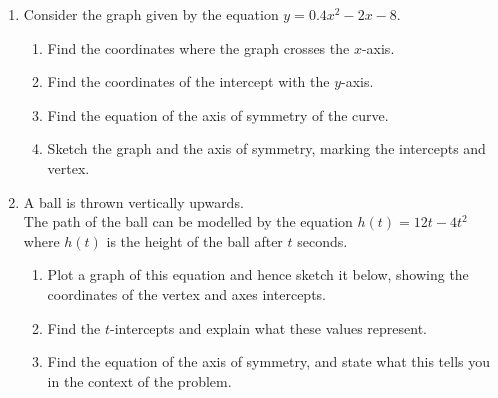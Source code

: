 \documentclass[12pt, twoside]{article}
\begin{document}
\begin{enumerate}
\newpage
\item Consider the graph given by the equation $y=0.4x^2-2x-8$.
    \begin{enumerate}[itemsep=1cm]
        \item Find the coordinates where the graph crosses the $x$-axis.
        \item Find the coordinates of the intercept with the $y$-axis.
        \item Find the equation of the axis of symmetry of the curve.
        \item Sketch the graph and the axis of symmetry, marking the intercepts and vertex.
    \end{enumerate}
    \begin{center}
    \end{center}

\newpage
\item A ball is thrown vertically upwards.\\[0.25cm]
The path of the ball can be modelled by the equation $h(t)=12t-4t^2$ where $h(t)$ is the height of the ball after $t$ seconds.
    \begin{enumerate}
        \item Plot a graph of this equation and hence sketch it below, showing the coordinates of the vertex and axes intercepts.
        \item Find the $t$-intercepts and explain what these values represent. \vspace{2cm}
        \item Find the equation of the axis of symmetry, and state what this tells you in the context of the problem. \vspace{2cm}
    \end{enumerate}
    \begin{center}
    \end{center}
    

\end{enumerate}
\end{document}
